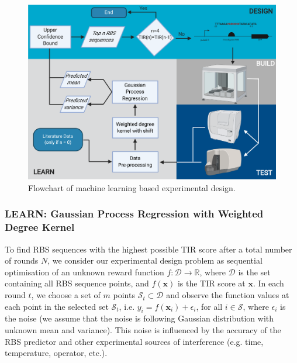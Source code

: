 \begin{figure}[h]
    \centering
    \includegraphics[scale=0.7]{plots/flowchart.pdf}
    \caption{Flowchart of machine learning based experimental design.}
    \label{fig: flowchart of machine learning based experimental design.}
\end{figure}

\subsubsection{LEARN: Gaussian Process Regression with Weighted Degree Kernel}

To find RBS sequences with the highest possible TIR score after a total number of rounds $N$,  we consider our experimental design problem as sequential optimisation of an unknown reward function $f: \mathcal{D} \rightarrow \mathbb{R}$, where $\mathcal{D}$ is the set containing all RBS sequence points, and $f(\mathbf{x})$ is the TIR score at $\mathbf{x}$. 
In each round $t$, we choose a set of $m$ points $\mathcal{S}_t \subset \mathcal{D}$ and observe the function values at each point in the selected set $\mathcal{S}_t$, i.e. $y_i = f(\mathbf{x}_i) + \epsilon_i$, for all $i \in \mathcal{S}$, where $\epsilon_i$ is the noise (we assume that the noise is following Gaussian distribution with unknown mean and variance). This noise is influenced by the accuracy of the RBS predictor and other experimental sources of interference (e.g. time, temperature, operator, etc.). 

